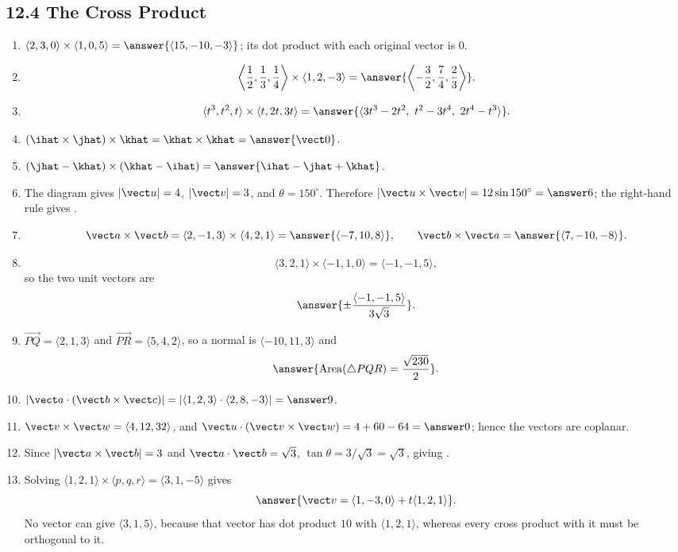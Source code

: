 \subsection*{12.4 The Cross Product}
\begin{enumerate}[label=\textbf{\arabic*.}, start=1]
\item $\langle2,3,0\rangle\times\langle1,0,5\rangle=\answer{\langle15,-10,-3\rangle}$; its dot product with each original vector is $0$.
\setcounter{enumi}{4}
\item \[\left\langle\frac12,\frac13,\frac14\right\rangle\times\langle1,2,-3\rangle=\answer{\left\langle-\frac32,\frac74,\frac23\right\rangle}.\]
\setcounter{enumi}{6}
\item \[\langle t^3,t^2,t\rangle\times\langle t,2t,3t\rangle=\answer{\langle3t^3-2t^2,\ t^2-3t^4,\ 2t^4-t^3\rangle}.\]
\setcounter{enumi}{8}
\item $(\ihat\times\jhat)\times\khat=\khat\times\khat=\answer{\vect0}$.
\setcounter{enumi}{10}
\item $(\jhat-\khat)\times(\khat-\ihat)=\answer{\ihat-\jhat+\khat}$.
\setcounter{enumi}{14}
\item The diagram gives $|\vect u|=4$, $|\vect v|=3$, and $\theta=150^\circ$. Therefore $|\vect u\times\vect v|=12\sin150^\circ=\answer6$; the right-hand rule gives .
\setcounter{enumi}{16}
\item \[\vect a\times\vect b=\langle2,-1,3\rangle\times\langle4,2,1\rangle=\answer{\langle-7,10,8\rangle},\qquad \vect b\times\vect a=\answer{\langle7,-10,-8\rangle}.\]
\setcounter{enumi}{18}
\item \[\langle3,2,1\rangle\times\langle-1,1,0\rangle=\langle-1,-1,5\rangle,\] so the two unit vectors are \[\answer{\pm\frac{\langle-1,-1,5\rangle}{3\sqrt3}}.\]
\setcounter{enumi}{28}
\item $\overrightarrow{PQ}=\langle2,1,3\rangle$ and $\overrightarrow{PR}=\langle5,4,2\rangle$, so a normal is $\langle-10,11,3\rangle$ and \[\answer{\operatorname{Area}(\triangle PQR)=\frac{\sqrt{230}}2}.\]
\setcounter{enumi}{32}
\item $|\vect a\cdot(\vect b\times\vect c)|=|\langle1,2,3\rangle\cdot\langle2,8,-3\rangle|=\answer9$.
\setcounter{enumi}{36}
\item $\vect v\times\vect w=\langle4,12,32\rangle$, and $\vect u\cdot(\vect v\times\vect w)=4+60-64=\answer0$; hence the vectors are coplanar.
\setcounter{enumi}{42}
\item Since $|\vect a\times\vect b|=3$ and $\vect a\cdot\vect b=\sqrt3$, $\tan\theta=3/\sqrt3=\sqrt3$, giving .
\setcounter{enumi}{43}
\item Solving $\langle1,2,1\rangle\times\langle p,q,r\rangle=\langle3,1,-5\rangle$ gives \[\answer{\vect v=\langle1,-3,0\rangle+t\langle1,2,1\rangle}.\] No vector can give $\langle3,1,5\rangle$, because that vector has dot product $10$ with $\langle1,2,1\rangle$, whereas every cross product with it must be orthogonal to it.
\end{enumerate}

